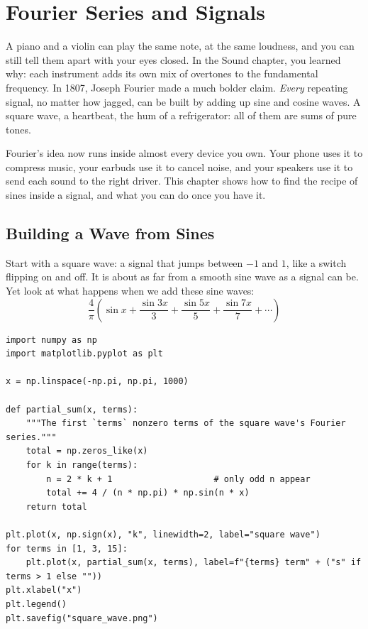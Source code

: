 \chapter{Fourier Series and Signals}

A piano and a violin can play the same note, at the same loudness, and you can
still tell them apart with your eyes closed. In the Sound chapter, you learned
why: each instrument adds its own mix of overtones to the fundamental frequency.
In 1807, Joseph Fourier made a much bolder claim. \emph{Every} repeating signal,
no matter how jagged, can be built by adding up sine and cosine waves. A square
wave, a heartbeat, the hum of a refrigerator: all of them are sums of pure tones.

Fourier's idea now runs inside almost every device you own. Your phone uses it to
compress music, your earbuds use it to cancel noise, and your speakers use it to
send each sound to the right driver. This chapter shows how to find the recipe of
sines inside a signal, and what you can do once you have it.

\section{Building a Wave from Sines}
Start with a square wave: a signal that jumps between $-1$ and $1$, like a switch
flipping on and off. It is about as far from a smooth sine wave as a signal can
be. Yet look at what happens when we add these sine waves:
$$\frac{4}{\pi}\left(\sin x + \frac{\sin 3x}{3} + \frac{\sin 5x}{5} + \frac{\sin 7x}{7} + \cdots\right)$$

\begin{verbatim}
import numpy as np
import matplotlib.pyplot as plt

x = np.linspace(-np.pi, np.pi, 1000)

def partial_sum(x, terms):
    """The first `terms` nonzero terms of the square wave's Fourier series."""
    total = np.zeros_like(x)
    for k in range(terms):
        n = 2 * k + 1                    # only odd n appear
        total += 4 / (n * np.pi) * np.sin(n * x)
    return total

plt.plot(x, np.sign(x), "k", linewidth=2, label="square wave")
for terms in [1, 3, 15]:
    plt.plot(x, partial_sum(x, terms), label=f"{terms} term" + ("s" if terms > 1 else ""))
plt.xlabel("x")
plt.legend()
plt.savefig("square_wave.png")
\end{verbatim}

